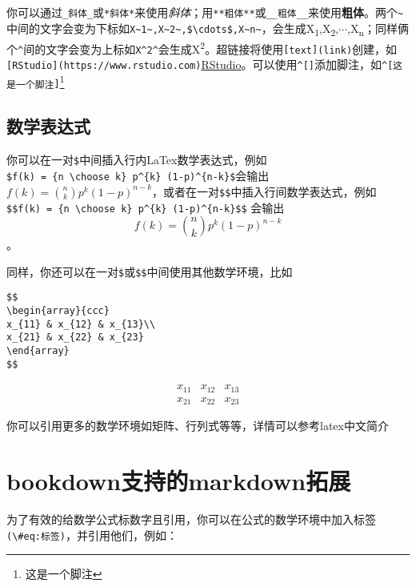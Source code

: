 \documentclass[singlesided]{Style/ucasthesis}%
\begin{document}
你可以通过\texttt{\_斜体\_}或\texttt{*斜体*}来使用\emph{斜体}；用\texttt{**粗体**}或\texttt{\_\_粗体\_\_}来使用\textbf{粗体}。两个\texttt{\textasciitilde{}}中间的文字会变为下标如\texttt{X\textasciitilde{}1\textasciitilde{},X\textasciitilde{}2\textasciitilde{},\$\textbackslash{}cdots\$,X\textasciitilde{}n\textasciitilde{}}，会生成X\textsubscript{1},X\textsubscript{2},\(\cdots\),X\textsubscript{n}；同样俩个\texttt{\^{}}间的文字会变为上标如\texttt{X\^{}2\^{}}会生成X\textsuperscript{2}。超链接将使用\texttt{{[}text{]}(link)}创建，如\texttt{{[}RStudio{]}(https://www.rstudio.com)}\href{https://www.rstudio.com}{RStudio}。可以使用\texttt{\^{}{[}{]}}添加脚注，如\texttt{\^{}{[}这是一个脚注{]}}\footnote{这是一个脚注}

\hypertarget{section-2}{%
\subsection{数学表达式}\label{section-2}}

你可以在一对\texttt{\$}中间插入行内LaTex数学表达式，例如\texttt{\$f(k)\ =\ \{n\ \textbackslash{}choose\ k\}\ p\^{}\{k\}\ (1-p)\^{}\{n-k\}\$}会输出\(f(k) = {n \choose k} p^{k} (1-p)^{n-k}\)，或者在一对\texttt{\$\$}中插入行间数学表达式，例如\texttt{\$\$f(k)\ =\ \{n\ \textbackslash{}choose\ k\}\ p\^{}\{k\}\ (1-p)\^{}\{n-k\}\$\$} 会输出 \[f(k) = {n \choose k} p^{k} (1-p)^{n-k}\]。

同样，你还可以在一对\texttt{\$}或\texttt{\$\$}中间使用其他数学环境，比如

\begin{verbatim}
$$
\begin{array}{ccc}
x_{11} & x_{12} & x_{13}\\
x_{21} & x_{22} & x_{23}
\end{array}
$$
\end{verbatim}

\[
\begin{array}{ccc}
x_{11} & x_{12} & x_{13}\\
x_{21} & x_{22} & x_{23}
\end{array}
\]

你可以引用更多的数学环境如矩阵、行列式等等，详情可以参考latex中文简介

\hypertarget{bookdownmarkdown}{%
\section{bookdown支持的markdown拓展}\label{bookdownmarkdown}}

为了有效的给数学公式标数字且引用，你可以在公式的数学环境中加入标签\texttt{(\textbackslash{}\#eq:标签)}，并引用他们，例如：
\end{document}
